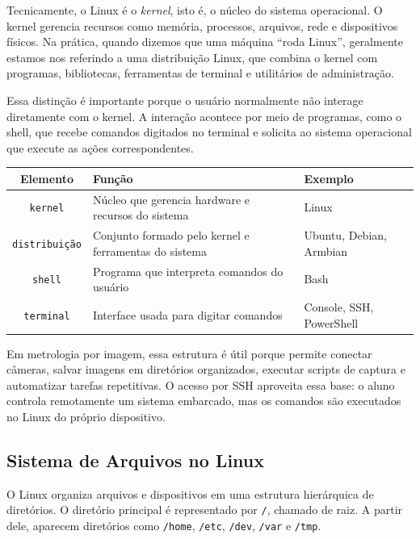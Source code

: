 \documentclass[12pt]{article}
\begin{document}
Tecnicamente, o Linux é o \textit{kernel}, isto é, o núcleo do sistema operacional. O kernel gerencia recursos como memória, processos, arquivos, rede e dispositivos físicos. Na prática, quando dizemos que uma máquina ``roda Linux'', geralmente estamos nos referindo a uma distribuição Linux, que combina o kernel com programas, bibliotecas, ferramentas de terminal e utilitários de administração.

Essa distinção é importante porque o usuário normalmente não interage diretamente com o kernel. A interação acontece por meio de programas, como o shell, que recebe comandos digitados no terminal e solicita ao sistema operacional que execute as ações correspondentes.

\begin{cmdbox}
\begin{tabularx}{\linewidth}{@{}C >{\raggedright\arraybackslash}X >{\raggedright\arraybackslash}X@{}}
\toprule
\textbf{Elemento} & \textbf{Função} & \textbf{Exemplo} \\
\midrule
\texttt{kernel} & Núcleo que gerencia hardware e recursos do sistema & Linux \\
\texttt{distribuição} & Conjunto formado pelo kernel e ferramentas do sistema & Ubuntu, Debian, Armbian \\
\texttt{shell} & Programa que interpreta comandos do usuário & Bash \\
\texttt{terminal} & Interface usada para digitar comandos & Console, SSH, PowerShell \\
\bottomrule
\end{tabularx}
\end{cmdbox}

Em metrologia por imagem, essa estrutura é útil porque permite conectar câmeras, salvar imagens em diretórios organizados, executar scripts de captura e automatizar tarefas repetitivas. O acesso por SSH aproveita essa base: o aluno controla remotamente um sistema embarcado, mas os comandos são executados no Linux do próprio dispositivo.

\subsection{Sistema de Arquivos no Linux}

O Linux organiza arquivos e dispositivos em uma estrutura hierárquica de diretórios. O diretório principal é representado por \texttt{/}, chamado de raiz. A partir dele, aparecem diretórios como \texttt{/home}, \texttt{/etc}, \texttt{/dev}, \texttt{/var} e \texttt{/tmp}.
\end{document}
